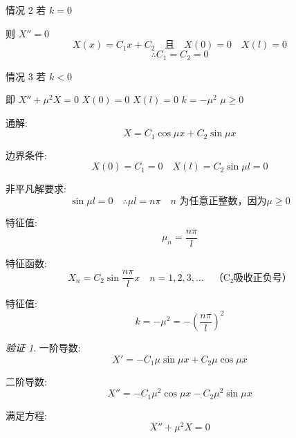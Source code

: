 \documentclass[12pt,a4paper]{article}
\numberwithin{subsection}{section}
\numberwithin{subsubsection}{subsection}
\theoremstyle{plain}
\theoremstyle{definition}
\theoremstyle{remark}
\newtheorem{verification}{验证}
\begin{document}
	
情况 2 \quad 若 \(k = 0\)

则 \(X'' = 0\)
	\begin{equation}
		X(x) = C_1 x + C_2 \quad \text{且} \quad X(0) = 0 \quad X(l) = 0
	\end{equation}
	\begin{equation}
		\therefore C_1 = C_2 = 0
	\end{equation}
	
情况 3 \quad 若 \(k < 0\)

即 \(X'' + \mu^2 X = 0\) \quad \(X(0) = 0\) \quad \(X(l) = 0\) \quad \(k = -\mu^2\)  \quad \(\mu \geq 0\)
	
	通解:
	\begin{equation}
		X = C_1 \cos \mu x + C_2 \sin \mu x
	\end{equation}
	
	
	
	边界条件:
	\begin{equation}
		X(0) = C_1 = 0 \quad X(l) = C_2 \sin \mu l = 0
	\end{equation}
	
	非平凡解要求:
	\begin{equation*}
		\sin \mu l = 0 \quad \therefore \mu l = n\pi \quad n \text{ 为任意正整数，因为$\mu \geq 0$}
	\end{equation*}
	
	特征值:
	\begin{equation}
		\mu_n = \frac{n\pi}{l}
	\end{equation}
	
	特征函数:
	\begin{equation}
		X_n = C_2 \sin \frac{n\pi}{l} x \quad n = 1, 2, 3, \ldots \quad \text{（C₂吸收正负号）}
	\end{equation}
	
	特征值:
	\begin{equation}
		k = -\mu^2 = -\left(\frac{n\pi}{l}\right)^2
	\end{equation}
	
	\begin{verification}	
		一阶导数:
		\begin{equation*}
			X' = -C_1 \mu \sin \mu x + C_2 \mu \cos \mu x
		\end{equation*}
		
		二阶导数:
		\begin{equation*}
			X'' = -C_1 \mu^2 \cos \mu x - C_2 \mu^2 \sin \mu x
		\end{equation*}
		
		满足方程:
		\begin{equation*}
			X'' + \mu^2 X = 0
		\end{equation*}
	\end{verification}	
	
\end{document}
